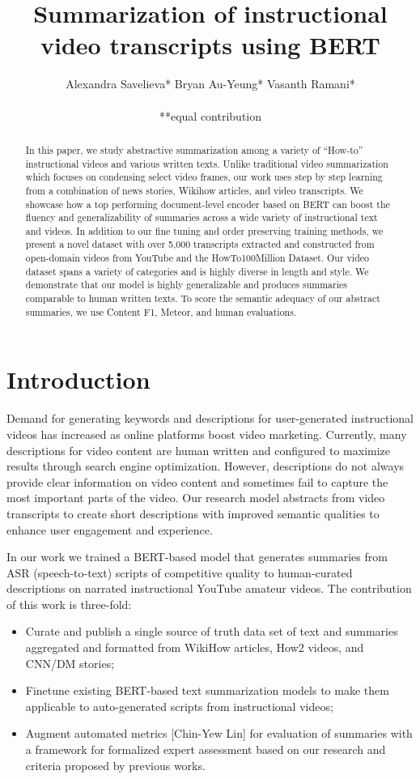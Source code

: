 \documentclass{article}
\title{Summarization of instructional video transcripts using BERT}
\author{%
 
  Alexandra Savelieva*\And
  Bryan Au-Yeung*\And
  Vasanth Ramani* \\
\\
**equal contribution 

}
\begin{document}
\maketitle

\begin{abstract}
In this paper, we study abstractive summarization among a variety of “How-to” instructional videos and various written texts. Unlike traditional video summarization which focuses on condensing select video frames, our work uses step by step learning from a combination of news stories, Wikihow articles, and video transcripts. We showcase how a top performing document-level encoder based on BERT can boost the fluency and generalizability of summaries across a wide variety of instructional text and videos. In addition to our fine tuning and order preserving training methods, we present a novel dataset with over 5,000 transcripts extracted and constructed from open-domain videos from YouTube and the HowTo100Million Dataset. Our video dataset spans a variety of categories and is highly diverse in length and style. We demonstrate that our model is highly generalizable and produces summaries comparable to human written texts. To score the semantic adequacy of our abstract summaries, we use Content F1, Meteor, and human evaluations.
\end{abstract}

\section{Introduction}
 
Demand for generating keywords and descriptions for user-generated instructional videos has increased as online platforms boost video marketing. Currently, many descriptions for video content are human written and configured to maximize results through search engine optimization. However, descriptions do not always provide clear information on video content and sometimes fail to capture the most important parts of the video. Our research model abstracts from video transcripts to create short descriptions with improved semantic qualities to enhance user engagement and experience.

In our work we trained a BERT-based model  that generates summaries from ASR (speech-to-text) scripts of competitive quality to human-curated descriptions on  narrated instructional YouTube amateur videos. The contribution of this work is three-fold:

\begin{itemize}

\item Curate and publish a single source of truth data set of text and summaries aggregated and formatted from WikiHow articles, How2 videos, and CNN/DM stories;
\item Finetune existing BERT-based text summarization models to make them applicable to auto-generated scripts from instructional videos; 
\item Augment automated  metrics [Chin-Yew Lin] for evaluation of summaries with a framework for formalized expert assessment based on our research and criteria proposed by previous works.
\end{itemize}
\end{document}
